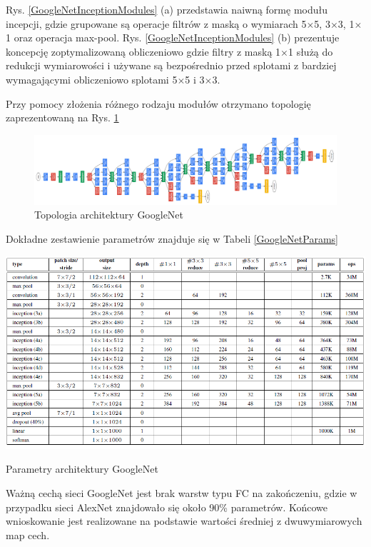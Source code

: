 Rys. \ref{GoogleNetInceptionModules} (a) przedstawia naiwną formę modułu incepcji, gdzie grupowane są operacje filtrów z maską o wymiarach 5$\times$5, 3$\times$3, 1$\times$1 oraz operacja max-pool. Rys. \ref{GoogleNetInceptionModules} (b) prezentuje koncepcję zoptymalizowaną obliczeniowo gdzie filtry z maską 1$\times$1 służą do redukcji wymiarowości i używane są bezpośrednio przed splotami z bardziej wymagającymi obliczeniowo splotami 5$\times$5 i 3$\times$3. 

Przy pomocy złożenia różnego rodzaju modułów otrzymano topologię zaprezentowaną na Rys. \ref{GoogleNetTopo}
\begin{figure}[h!]
	\centering
	\includegraphics[width=1\textwidth]{figures/GoogleNet.png}
	\caption{Topologia architektury GoogleNet}
	\label{GoogleNetTopo}
\end{figure}

Dokładne zestawienie parametrów znajduje się w Tabeli \ref{GoogleNetParams}

\begin{table}[h!]
	\centering
	\includegraphics[width=1\textwidth]{figures/GoogleNetparams.png}
	\caption{Parametry architektury GoogleNet}
	\label{GoogleNetParams}
\end{table}

Ważną cechą sieci GoogleNet jest brak warstw typu FC na zakończeniu, gdzie w przypadku sieci AlexNet znajdowało się około 90\% parametrów. Końcowe wnioskowanie jest realizowane na podstawie wartości średniej z dwuwymiarowych map cech.

